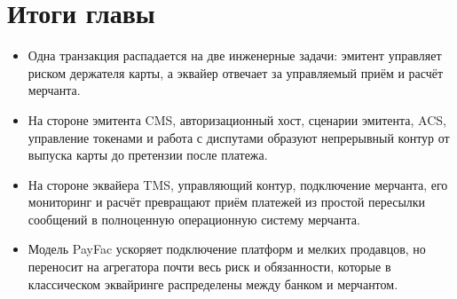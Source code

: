 \section*{Итоги главы}
\begin{itemize}
  \item Одна транзакция распадается на две инженерные задачи:
        эмитент управляет риском держателя карты, а эквайер
        отвечает за управляемый приём и расчёт мерчанта.
  \item На стороне эмитента CMS, авторизационный хост,
        сценарии эмитента, ACS, управление токенами
        и работа с диспутами
        образуют непрерывный контур от выпуска карты
        до претензии после платежа.
  \item На стороне эквайера TMS, управляющий контур,
        подключение мерчанта, его мониторинг и расчёт
        превращают приём платежей из простой пересылки сообщений
        в полноценную операционную систему мерчанта.
  \item Модель PayFac ускоряет подключение платформ и мелких
        продавцов, но переносит на агрегатора почти весь риск
        и обязанности, которые в классическом эквайринге
        распределены между банком и мерчантом.
\end{itemize}
